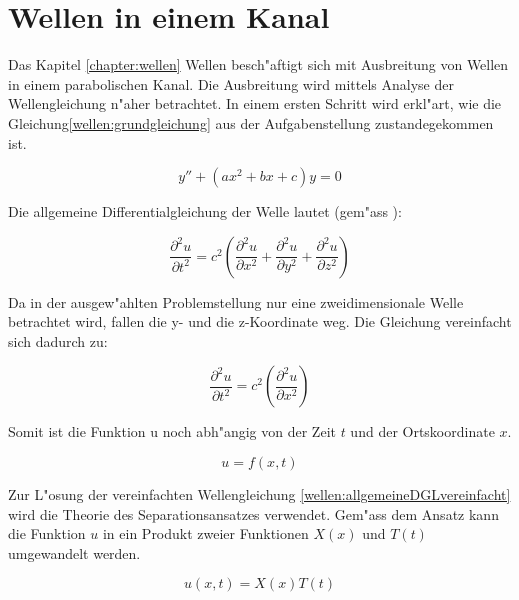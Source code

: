 \chapter{Wellen in einem Kanal\label{chapter:wellen}}
\begin{refsection}
\clearpage

Das Kapitel \ref{chapter:wellen} Wellen besch"aftigt sich mit Ausbreitung von 
Wellen in einem parabolischen Kanal. Die Ausbreitung wird mittels Analyse der 
Wellengleichung n"aher betrachtet. In einem ersten Schritt wird erkl"art, wie 
die Gleichung\ref{wellen:grundgleichung} aus der Aufgabenstellung 
zustandegekommen ist.

\begin{equation}
	y'' + (ax^2+bx+c)y
	=
	0
	\label{wellen:grundgleichung}
\end{equation}

Die allgemeine Differentialgleichung der Welle lautet (gem"ass 
\cite{wellen:smirnow2}):

\begin{equation}
	\frac{\partial^2 u}{\partial t^2}
	=
	c^2
	\left(
		\frac{\partial^2 u}{\partial x^2} 
		+ \frac{\partial^2 u}{\partial y^2} 
		+ \frac{\partial^2 u}{\partial z^2}
	\right)
	\label{wellen:allgemeineDGL}
\end{equation}

Da in der ausgew"ahlten Problemstellung nur eine zweidimensionale Welle 
betrachtet wird, fallen die y- und die z-Koordinate weg. Die Gleichung 
vereinfacht sich dadurch zu:

\begin{equation}
	\frac{\partial^2 u}{\partial t^2}
	=
	c^2
	\left(
		\frac{\partial^2 u}{\partial x^2} 
	\right)
	\label{wellen:allgemeineDGLvereinfacht}
\end{equation}

Somit ist die Funktion u noch abh"angig von der Zeit $t$ und der Ortskoordinate 
$x$.

\begin{equation}
	u = f(x,t)
\end{equation}

Zur L"osung der vereinfachten Wellengleichung 
\ref{wellen:allgemeineDGLvereinfacht} wird die Theorie des Separationsansatzes 
verwendet. Gem"ass dem Ansatz kann die Funktion $u$ in ein Produkt zweier 
Funktionen $X(x)$ und $T(t)$ umgewandelt werden.

\begin{equation}
	u (x,t) = X(x) T(t)
	\label{wellen:separierteFunktion}
\end{equation}


\end{refsection}
